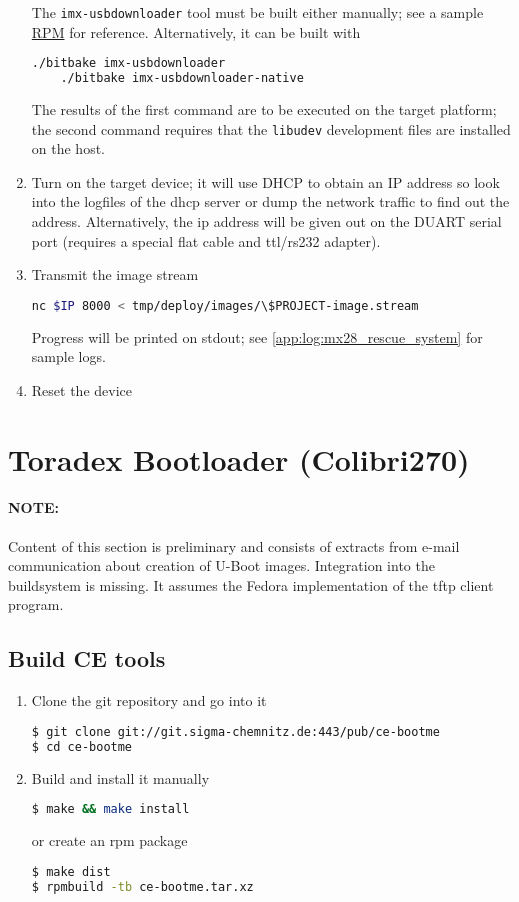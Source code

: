 \begin{enumerate}
  The \texttt{imx-usbdownloader} tool must be built either manually;
  see a sample
  \href{http://www.sigma-chemnitz.de/elito/sources/imx-usbdownloader-0.0.2-1.fc17x.src.rpm}{RPM}
  for reference.  Alternatively, it can be built with
  \begin{lstlisting}[language=sh]
    ./bitbake imx-usbdownloader
    ./bitbake imx-usbdownloader-native
  \end{lstlisting}
  The results of the first command are to be executed on the target
  platform; the second command requires that the \texttt{libudev}
  development files are installed on the host.
\item Turn on the target device; it will use DHCP to obtain an IP
  address so look into the logfiles of the dhcp server or dump the
  network traffic to find out the address.  Alternatively, the ip
  address will be given out on the DUART serial port (requires a
  special flat cable and ttl/rs232 adapter).
\item Transmit the image stream
  \begin{lstlisting}[language=sh]
    nc $IP 8000 < tmp/deploy/images/\$PROJECT-image.stream
  \end{lstlisting}
  Progress will be printed on stdout; see
  \ref{app:log:mx28_rescue_system} for sample logs.
\item Reset the device
\end{enumerate}


\section{Toradex Bootloader (Colibri270)}

\paragraph{NOTE:} Content of this section is preliminary and consists
of extracts from e-mail communication about creation of U-Boot images.
Integration into the buildsystem is missing.  It assumes the Fedora
implementation of the tftp client program.

\subsection{Build CE tools}

\begin{enumerate}
\item Clone the git repository and go into it
\begin{lstlisting}[language=sh]
$ git clone git://git.sigma-chemnitz.de:443/pub/ce-bootme
$ cd ce-bootme
\end{lstlisting}
\item Build and install it manually
\begin{lstlisting}[language=sh]
$ make && make install
\end{lstlisting}%
or create an rpm package
\begin{lstlisting}[language=sh]
$ make dist
$ rpmbuild -tb ce-bootme.tar.xz
\end{lstlisting}
\end{enumerate}


